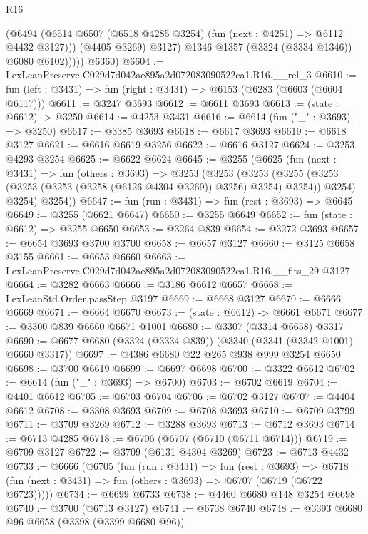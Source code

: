 \begin{lexlean}{R16}
\begin{coremodule}
                  (@6494
                    (@6514 @6507 (@6518 @4285 @3254) (fun (next : @4251) => @6112 @4432 @3127)))
                  (@4405 @3269)
                  @3127)
                @1346
                @1357
                (@3324 (@3334 @1346))
                @6080
                @6102)))))
      @6360)
@6604 := LexLeanPreserve.C029d7d042ae895a2d072083090522ca1.R16.__rel_3
@6610 := fun (left : @3431) => fun (right : @3431) => @6153 (@6283 (@6603 (@6604 @6117)))
@6611 := @3247 @3693
@6612 := @6611 @3693
@6613 := (state : @6612) -> @3250
@6614 := @4253 @3431
@6616 := @6614 (fun ("_" : @3693) => @3250)
@6617 := @3385 @3693
@6618 := @6617 @3693
@6619 := @6618 @3127
@6621 := @6616 @6619 @3256
@6622 := @6616 @3127
@6624 := @3253 @4293 @3254
@6625 := @6622 @6624
@6645 := @3255
    (@6625
      (fun (next : @3431) =>
      fun (others : @3693) =>
      @3253
        (@3253
          (@3253
            (@3255 (@3253 (@3253 (@3253 (@3258 (@6126 @4304 @3269)) @3256) @3254) @3254))
            @3254)
          @3254)
        @3254))
@6647 := fun (run : @3431) => fun (rest : @3693) => @6645
@6649 := @3255 (@6621 @6647)
@6650 := @3255 @6649
@6652 := fun (state : @6612) => @3255 @6650
@6653 := @3264 @839
@6654 := @3272 @3693
@6657 := @6654 @3693 @3700 @3700
@6658 := @6657 @3127
@6660 := @3125 @6658 @3155
@6661 := @6653 @6660
@6663 := LexLeanPreserve.C029d7d042ae895a2d072083090522ca1.R16.__fits_29 @3127
@6664 := @3282 @6663
@6666 := @3186 @6612 @6657
@6668 := LexLeanStd.Order.passStep @3197
@6669 := @6668 @3127
@6670 := @6666 @6669
@6671 := @6664 @6670
@6673 := (state : @6612) -> @6661 @6671
@6677 := @3300 @839 @6660 @6671 @1001
@6680 := @3307 (@3314 @6658) @3317
@6690 := @6677 @6680 (@3324 (@3334 @839)) (@3340 (@3341 (@3342 @1001) @6660 @3317))
@6697 := @4386 @6680 @22 @265 @938 @999 @3254 @6650
@6698 := @3700 @6619
@6699 := @6697 @6698
@6700 := @3322 @6612
@6702 := @6614 (fun ("_" : @3693) => @6700)
@6703 := @6702 @6619
@6704 := @4401 @6612
@6705 := @6703 @6704
@6706 := @6702 @3127
@6707 := @4404 @6612
@6708 := @3308 @3693
@6709 := @6708 @3693
@6710 := @6709 @3799
@6711 := @3709 @3269
@6712 := @3288 @3693
@6713 := @6712 @3693
@6714 := @6713 @4285
@6718 := @6706 (@6707 (@6710 (@6711 @6714)))
@6719 := @6709 @3127
@6722 := @3709 (@6131 @4304 @3269)
@6723 := @6713 @4432
@6733 := @6666
    (@6705
      (fun (run : @3431) =>
      fun (rest : @3693) =>
      @6718 (fun (next : @3431) => fun (others : @3693) => @6707 (@6719 (@6722 @6723)))))
@6734 := @6699 @6733
@6738 := @4460 @6680 @148 @3254 @6698
@6740 := @3700 (@6713 @3127)
@6741 := @6738 @6740
@6748 := @3393 @6680 @96 @6658 (@3398 (@3399 @6680 @96))

\end{coremodule}
\end{lexlean}

